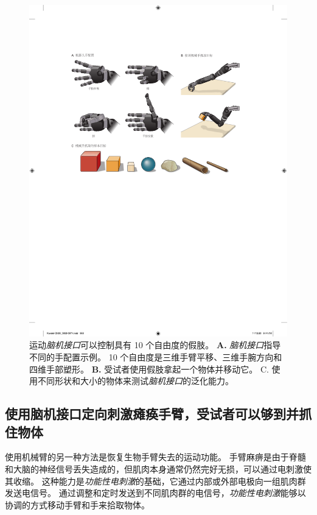 \begin{figure}[htbp]
	\centering
	\includegraphics[width=0.95\linewidth]{chap39/fig_39_10}
	\caption{运动\textit{脑机接口}可以控制具有 10 个自由度的假肢。 
		\textbf{A.} \textit{脑机接口}指导不同的手配置示例。
		10 个自由度是三维手臂平移、三维手腕方向和四维手部塑形。
		\textbf{B.} 受试者使用假肢拿起一个物体并移动它。
		C. 使用不同形状和大小的物体来测试\textit{脑机接口}的泛化能力\cite{wodlinger2014ten}。}
	\label{fig:39_10}
\end{figure}



\subsection{使用脑机接口定向刺激瘫痪手臂，受试者可以够到并抓住物体}

使用机械臂的另一种方法是恢复生物手臂失去的运动功能。
手臂麻痹是由于脊髓和大脑的神经信号丢失造成的，但肌肉本身通常仍然完好无损，可以通过电刺激使其收缩。
这种能力是\textit{功能性电刺激}的基础，它通过内部或外部电极向一组肌肉群发送电信号。
通过调整和定时发送到不同肌肉群的电信号，\textit{功能性电刺激}能够以协调的方式移动手臂和手来拾取物体。


